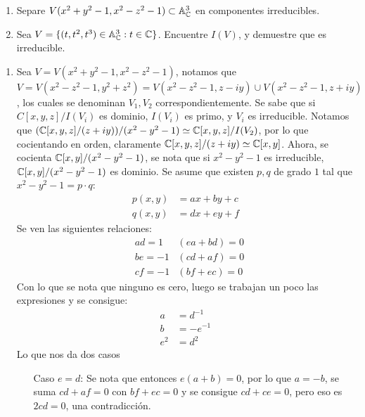 \begin{prob}{1.33}
    \begin{enumerate}
        \item Separe \(V(x^2+y^2-1,x^2-z^2-1)\subset\mathbb{A}_{\mathbb{C}}^3\) en componentes irreducibles.
        \item Sea \(V=\{(t,t^2,t^3)\in\mathbb{A}_{\mathbb{C}}^3:t\in\mathbb{C}\}\). Encuentre \(I(V)\), y demuestre que es irreducible.
    \end{enumerate}
\end{prob}

\begin{sol}{1.33}
    \begin{enumerate}
        \item Sea \(V=V(x^2+y^2-1,x^2-z^2-1)\), notamos que \(V=V(x^2-z^2-1,y^2+z^2)=V(x^2-z^2-1,z-iy)\cup V(x^2-z^2-1,z+iy)\), los cuales se denominan \(V_1,V_2\) correspondientemente. Se sabe que si \(C[x,y,z]/I(V_i)\) es dominio, \(I(V_i)\) es primo, y \(V_i\) es irreducible. Notamos que \((\mathbb{C}[x,y,z]/(z+iy))/(x^2-y^2-1)\simeq\mathbb{C}[x,y,z]/I(V_2)\), por lo que cocientando en orden, claramente \(\mathbb{C}[x,y,z]/(z+iy)\simeq\mathbb{C}[x,y]\). Ahora, se cocienta \(\mathbb{C}[x,y]/(x^2-y^2-1)\), se nota que si \(x^2-y^2-1\) es irreducible, \(\mathbb{C}[x,y]/(x^2-y^2-1)\) es dominio. Se asume que existen \(p,q\) de grado \(1\) tal que \(x^2-y^2-1=p\cdot q\):
              \begin{align*}
                  p(x,y) & = ax+by+c \\
                  q(x,y) & = dx+ey+f
              \end{align*}
              Se ven las siguientes relaciones:
              \begin{align*}
                   & ad=1  & (ea+bd)=0 \\
                   & be=-1 & (cd+af)=0 \\
                   & cf=-1 & (bf+ec)=0
              \end{align*}
              Con lo que se nota que ninguno es cero, luego se trabajan un poco las expresiones y se consigue:
              \begin{align*}
                  a   & =d^{-1}  \\
                  b   & =-e^{-1} \\
                  e^2 & =d^2
              \end{align*}
              Lo que nos da dos casos
              \begin{itemize}
                  \item[Caso \(e=d\):] Se nota que entonces \(e(a+b)=0\), por lo que \(a=-b\), se suma \(cd+af=0\) con \(bf+ec=0\) y se consigue \(cd+ce=0\), pero eso es \(2cd=0\), una contradicción.

\end{itemize}
\end{enumerate}
\end{sol}
